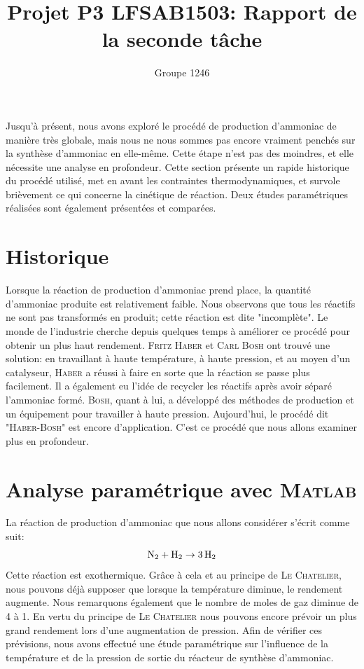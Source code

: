 \documentclass[11pt,a4paper]{report}
\author{Groupe 1246}
\title{Projet P3 LFSAB1503: Rapport de la seconde tâche}
\begin{document}
\maketitle


Jusqu'à présent, nous avons exploré le procédé de production d'ammoniac de manière très globale, mais nous ne nous 
sommes pas encore vraiment penchés sur la synthèse d'ammoniac en elle-même. Cette étape n'est pas des moindres, et 
elle nécessite une analyse en profondeur. Cette section présente un rapide historique du procédé utilisé, met en 
avant les contraintes thermodynamiques, et survole brièvement ce qui concerne la cinétique de réaction. Deux études
paramétriques réalisées sont également présentées et comparées.

\section{Historique}

Lorsque la réaction de production d'ammoniac prend place, la quantité d'ammoniac produite est relativement faible. 
Nous observons que tous les réactifs ne sont pas transformés en produit; cette réaction est dite "incomplète". 
Le monde de l'industrie cherche depuis quelques temps à améliorer ce procédé pour obtenir un plus haut rendement. 
\textsc{Fritz Haber} et \textsc{Carl Bosh} ont trouvé une solution: en travaillant à haute température, à haute pression, et au moyen 
d'un catalyseur, \textsc{Haber} a réussi à faire en sorte que la réaction se passe plus facilement. Il a également eu l'idée 
de recycler les réactifs après avoir séparé l'ammoniac formé. \textsc{Bosh}, quant à lui, a développé des méthodes de 
production et un équipement pour travailler à haute pression. Aujourd'hui, le procédé dit "\textsc{Haber-Bosh}" est encore 
d'application. C'est ce procédé que nous allons examiner plus en profondeur.

\section{Analyse paramétrique avec \textsc{Matlab}}

La réaction de production d'ammoniac que nous allons considérer s'écrit comme suit:
$$\ce{N2} + \ce{H2} \rightarrow \ce{3H2}$$
Cette réaction est exothermique. Grâce à cela et au principe de \textsc{Le Chatelier}, nous pouvons déjà supposer que lorsque 
la température diminue, le rendement augmente. Nous remarquons également que le nombre de moles de gaz diminue de 4 à
1. En vertu du principe de \textsc{Le Chatelier} nous pouvons encore prévoir un plus grand rendement lors d'une augmentation de 
pression.
Afin de vérifier ces prévisions, nous avons effectué une étude paramétrique sur l'influence de la température et de la
pression de sortie du réacteur de synthèse d'ammoniac.
\end{document}
